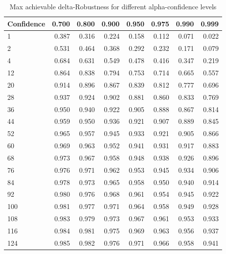 \begin{table}
\centering
\caption{Max achievable delta-Robustness for different alpha-confidence levels}
\label{tab:maxdelta}
\begin{tabular}{lrrrrrrr}
\toprule
Confidence &  0.700 &  0.800 &  0.900 &  0.950 &  0.975 &  0.990 &  0.999 \\
\midrule
1   &  0.387 &  0.316 &  0.224 &  0.158 &  0.112 &  0.071 &  0.022 \\
2   &  0.531 &  0.464 &  0.368 &  0.292 &  0.232 &  0.171 &  0.079 \\
4   &  0.684 &  0.631 &  0.549 &  0.478 &  0.416 &  0.347 &  0.219 \\
12  &  0.864 &  0.838 &  0.794 &  0.753 &  0.714 &  0.665 &  0.557 \\
20  &  0.914 &  0.896 &  0.867 &  0.839 &  0.812 &  0.777 &  0.696 \\
28  &  0.937 &  0.924 &  0.902 &  0.881 &  0.860 &  0.833 &  0.769 \\
36  &  0.950 &  0.940 &  0.922 &  0.905 &  0.888 &  0.867 &  0.814 \\
44  &  0.959 &  0.950 &  0.936 &  0.921 &  0.907 &  0.889 &  0.845 \\
52  &  0.965 &  0.957 &  0.945 &  0.933 &  0.921 &  0.905 &  0.866 \\
60  &  0.969 &  0.963 &  0.952 &  0.941 &  0.931 &  0.917 &  0.883 \\
68  &  0.973 &  0.967 &  0.958 &  0.948 &  0.938 &  0.926 &  0.896 \\
76  &  0.976 &  0.971 &  0.962 &  0.953 &  0.945 &  0.934 &  0.906 \\
84  &  0.978 &  0.973 &  0.965 &  0.958 &  0.950 &  0.940 &  0.914 \\
92  &  0.980 &  0.976 &  0.968 &  0.961 &  0.954 &  0.945 &  0.922 \\
100 &  0.981 &  0.977 &  0.971 &  0.964 &  0.958 &  0.949 &  0.928 \\
108 &  0.983 &  0.979 &  0.973 &  0.967 &  0.961 &  0.953 &  0.933 \\
116 &  0.984 &  0.981 &  0.975 &  0.969 &  0.963 &  0.956 &  0.937 \\
124 &  0.985 &  0.982 &  0.976 &  0.971 &  0.966 &  0.958 &  0.941 \\
\bottomrule
\end{tabular}
\end{table}
